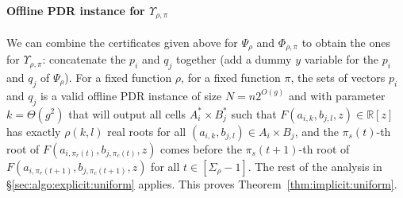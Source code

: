 \paragraph{Offline PDR instance for $\Upsilon_{\rho,\pi}$}

We can combine the certificates given above for $\Psi_\rho$ and
$\Phi_{\rho,\pi}$ to obtain the ones for $\Upsilon_{\rho,\pi}$: concatenate the
$p_i$ and $q_j$ together (add a dummy $y$ variable for the $p_i$ and $q_j$ of
$\Psi_\rho$).
%
For a fixed function $\rho$,
for a fixed function $\pi$,
the sets of vectors $p_i$ and $q_j$ is a valid offline PDR instance
of size $N = n 2^{O(g)}$ and with parameter $k = \Theta(g^2)$
that will
output all cells $A^*_i \times B^*_j$ such that
$F(a_{i,k},b_{j,l},z) \in
\mathbb{R}[z]$ has exactly $\rho(k,l)$ real roots for all $(a_{i,k},b_{j,l}) \in A_i
\times B_j$,
and the $\pi_s(t)$-th root of $F(a_{i,\pi_r(t)},b_{j,\pi_c(t)},z)$
comes before the $\pi_s(t+1)$-th root of $F(a_{i,\pi_r(t+1)},b_{j,\pi_c(t+1)},z)$
for all $t \in [\Sigma_\rho-1]$.
%
The rest of the analysis in \S\ref{sec:algo:explicit:uniform} applies.
This proves Theorem~\ref{thm:implicit:uniform}.
